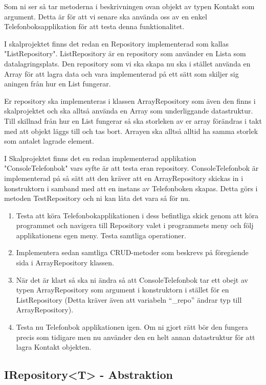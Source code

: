 \documentclass{article}
\begin{document}
  Som ni ser så tar metoderna i beskrivningen ovan objekt av typen Kontakt som argument. Detta är för att vi senare ska använda oss av en enkel Telefonboksapplikation för att testa denna funktionalitet.
  
  I skalprojektet finns det redan en Repository implementerad som kallas "ListRepository". ListRepository är en repository som använder en Lista som datalagringsplats. Den repository som vi ska skapa nu ska i stället använda en Array för att lagra data och vara implementerad på ett sätt som skiljer sig aningen från hur en List fungerar.
  
  Er repository ska implementeras i klassen ArrayRepository som även den finns i skalprojektet och ska alltså använda en Array som underliggande datastruktur. Till skillnad från hur en List fungerar så ska storleken av er array förändras i takt med att objekt läggs till och tas bort. Arrayen ska alltså alltid ha samma storlek som antalet lagrade element.

I Skalprojektet finns det en redan implementerad applikation "ConsoleTelefonbok" vars syfte är att testa eran repository. ConsoleTelefonbok är implementerad på så sätt att den kräver att en ArrayRepository skickas in i konstruktorn i samband med att en instans av Telefonboken skapas. Detta görs i metoden TestRepository och ni kan låta det vara så för nu.
    \begin{enumerate}
                 \item Testa att köra Telefonbokapplikationen i dess befintliga skick genom att köra programmet och navigera till Repository valet i programmets meny och följ applikationens egen meny. Testa samtliga operationer.
    	          \item Implementera sedan samtliga CRUD-metoder som beskrevs på föregående sida i ArrayRepository klassen.
    	          \item När det är klart så ska ni ändra så att ConsoleTelefonbok tar ett obejt av typen ArrayRepository som argument i konstruktorn i stället för en ListRepository (Detta kräver även att variabeln ``\_repo'' ändrar typ till ArrayRepository).
    	          \item Testa nu Telefonbok applikationen igen. Om ni gjort rätt bör den fungera precis som tidigare men nu använder den en helt annan datastruktur för att lagra Kontakt objekten.
    	              
     \end{enumerate}

  \subsection*{IRepository<T> - Abstraktion}
\end{document}

